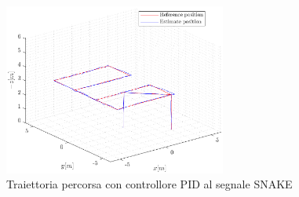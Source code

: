 \begin{figure}
	\centering
	\includegraphics[width=0.65\textwidth]{Simulazioni/Figure/PID/SNAKE/Trajectory}
	\caption{Traiettoria percorsa con controllore PID al segnale SNAKE}
	\label{fig:SNAKEtraPID}
\end{figure}

